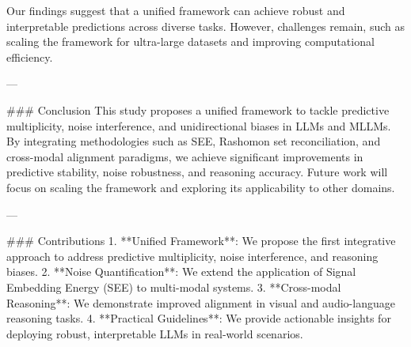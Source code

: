 Our findings suggest that a unified framework can achieve robust and interpretable predictions across diverse tasks. However, challenges remain, such as scaling the framework for ultra-large datasets and improving computational efficiency.

---

### Conclusion
This study proposes a unified framework to tackle predictive multiplicity, noise interference, and unidirectional biases in LLMs and MLLMs. By integrating methodologies such as SEE, Rashomon set reconciliation, and cross-modal alignment paradigms, we achieve significant improvements in predictive stability, noise robustness, and reasoning accuracy. Future work will focus on scaling the framework and exploring its applicability to other domains.

---

### Contributions
1. **Unified Framework**: We propose the first integrative approach to address predictive multiplicity, noise interference, and reasoning biases.
2. **Noise Quantification**: We extend the application of Signal Embedding Energy (SEE) to multi-modal systems.
3. **Cross-modal Reasoning**: We demonstrate improved alignment in visual and audio-language reasoning tasks.
4. **Practical Guidelines**: We provide actionable insights for deploying robust, interpretable LLMs in real-world scenarios.